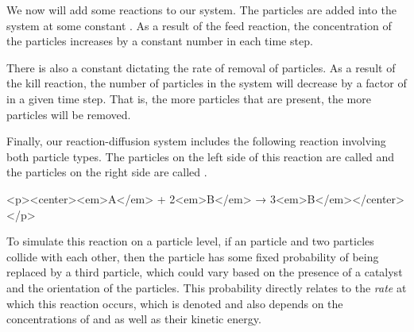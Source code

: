 \begin{qbox}\end{qbox}

We now will add some reactions to our system. The  particles are added into the system at some constant  . As a result of the feed reaction, the concentration of the  particles increases by a constant number in each time step.

\begin{note}\end{note}

There is also a  constant  dictating the rate of removal of  particles. As a result of the kill reaction, the number of  particles in the system will decrease by a factor of  in a given time step. That is, the more  particles that are present, the more  particles will be removed.

Finally, our reaction-diffusion system includes the following reaction involving both particle types. The particles on the left side of this reaction are called  and the particles on the right side are called .

<p><center><em>A</em> + 2<em>B</em> → 3<em>B</em></center></p>

To simulate this reaction on a particle level, if an  particle and two  particles collide with each other, then the  particle has some fixed probability of being replaced by a third  particle, which could vary based on the presence of a catalyst and the orientation of the particles. This probability directly relates to the \textit{rate} at which this reaction occurs, which is denoted  and also depends on the concentrations of  and  as well as their kinetic energy.

